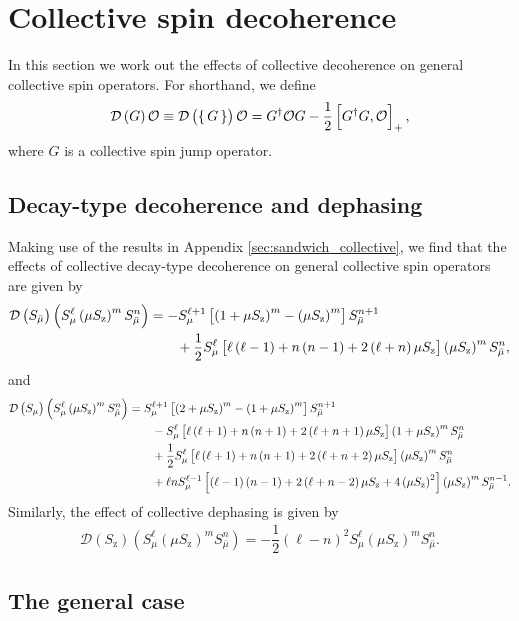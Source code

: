 \documentclass[pra,twocolumn,longbibliography]{revtex4-2}
\newcommand{\f}[2]{\dfrac{#1}{#2}} %
\newcommand{\p}[1]{\left( #1 \right)} %
\renewcommand{\sp}[1]{\left[ #1 \right]} %
\newcommand{\D}{\mathcal{D}}
\renewcommand{\O}{\mathcal{O}}
\newcommand{\z}{\text{z}}
\newcommand{\bmu}{{\bar\mu}}
\newcommand{\1}{\mathds{1}}
\begin{document}
\section{Collective spin decoherence}
\label{sec:decoherence_collective}

In this section we work out the effects of collective decoherence on
general collective spin operators.  For shorthand, we define
\begin{align}
  \D\p{G} \O
  \equiv \D\p{\set{G}} \O
  = G^\dag \O G - \f12\sp{G^\dag G, \O}_+,
\end{align}
where $G$ is a collective spin jump operator.

\subsection{Decay-type decoherence and dephasing}
\label{sec:decay_dephasing_collective}

Making use of the results in Appendix \ref{sec:sandwich_collective},
we find that the effects of collective decay-type decoherence on
general collective spin operators are given by
\begin{align}
  \D\p{S_\bmu} \p{S_\mu^\ell \p{\mu S_\z}^m S_\bmu^n}
  &= -S_\mu^{\ell+1} \sp{\p{1+\mu S_\z}^m - \p{\mu S_\z}^m} S_\bmu^{n+1}
  \notag \\
  &\qquad + \f12 S_\mu^\ell \sp{\ell\p{\ell-1} + n\p{n-1}
    + 2\p{\ell+n}\mu S_\z} \p{\mu S_\z}^m S_\bmu^n,
\end{align}
and
\begin{align}
  \D\p{S_\mu} \p{S_\mu^\ell \p{\mu S_\z}^m S_\bmu^n}
  &= S_\mu^{\ell+1} \sp{\p{2+\mu S_\z}^m-\p{1+\mu S_\z}^m} S_\bmu^{n+1}
  \notag \\
  &\qquad - S_\mu^\ell
  \sp{\ell\p{\ell+1} + n\p{n+1}+2\p{\ell+n+1}\mu S_\z}
  \p{1+\mu S_\z}^m S_\bmu^n \notag \\
  &\qquad + \f12 S_\mu^\ell
  \sp{\ell\p{\ell+1} + n\p{n+1}+2\p{\ell+n+2}\mu S_\z}
  \p{\mu S_\z}^m S_\bmu^n \notag \\
  &\qquad + \ell n S_\mu^{\ell-1}
  \sp{\p{\ell-1}\p{n-1}+2\p{\ell+n-2}\mu S_\z + 4\p{\mu S_\z}^2}
  \p{\mu S_\z}^m S_\bmu^{n-1}.
\end{align}
Similarly, the effect of collective dephasing is given by
\begin{align}
  \D\p{S_\z} \p{S_\mu^\ell \p{\mu S_\z}^m S_\bmu^n}
  = -\f12 \p{\ell-n}^2 S_\mu^\ell \p{\mu S_\z}^m S_\bmu^n.
\end{align}


\subsection{The general case}
\label{sec:general_collective}
\end{document}
